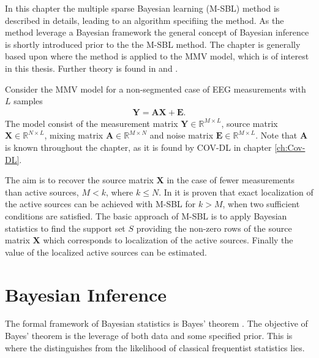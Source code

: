 In this chapter the multiple sparse Bayesian learning (M-SBL) method is described in details, leading to an algorithm specifiing the method. As the method leverage a Bayesian framework the general concept of Bayesian inference is shortly introduced prior to the the M-SBL method. The chapter is generally based upon \cite{Balkan2014} where the method is applied to the MMV model, which is of interest in this thesis. Further theory is found in \cite{phd_wipf} and \cite{article_wipf}.

Consider the MMV model for a non-segmented case of EEG measurements with $L$ samples
\begin{align}
\mathbf{Y} = \mathbf{AX} + \mathbf{E}.\label{eq:MSBL_MMV}
\end{align}
The model consist of the measurement matrix $\mathbf{Y} \in \mathbb{R}^{M \times L}$, source matrix $\mathbf{X} \in \mathbb{R}^{N \times L}$, mixing matrix $\mathbf{A} \in \mathbb{R}^{M \times N}$ and noise matrix $\mathbf{E} \in \mathbb{R}^{M \times L}$. Note that $\mathbf{A}$ is known throughout the chapter, as it is found by COV-DL in chapter \ref{ch:Cov-DL}.

The aim is to recover the source matrix $\mathbf{X}$ in the case of fewer measurements than active sources, $M < k$, where $k\leq N$. 
In \cite{Balkan2014} it is proven that exact localization of the active sources can be achieved with M-SBL for $k > M$, when two sufficient conditions are satisfied.   
The basic approach of M-SBL is to apply Bayesian statistics to find the support set $S$ providing the non-zero rows of the source matrix $\mathbf{X}$ which corresponds to localization of the active sources. Finally the value of the localized active sources can be estimated.  

\section{Bayesian Inference} 
The formal framework of Bayesian statistics is Bayes' theorem \cite[p. 86]{Kay}. The objective of Bayes' theorem is the leverage of both data and some specified prior. This is where the distinguishes from the likelihood of classical frequentist statistics lies.     

